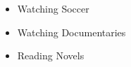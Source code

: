 
\begin{cventries}
\cventry
  {} %
  {} %
  {} %
  {} %
  {
    \begin{itemize}
        \item Watching Soccer
        \item Watching Documentaries
        \item Reading Novels
    \end{itemize}
    }
\end{cventries}
